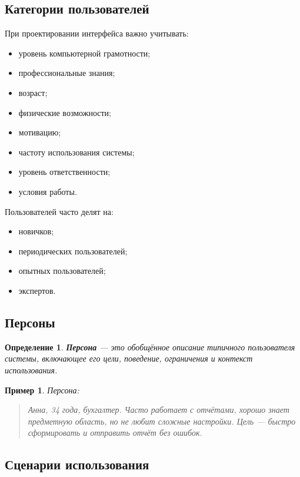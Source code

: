 \documentclass[12pt,a4paper]{article}
\newtheorem{definition}{Определение}
\newtheorem{example}{Пример}
\begin{document}
\subsection{Категории пользователей}

При проектировании интерфейса важно учитывать:
\begin{itemize}
    \item уровень компьютерной грамотности;
    \item профессиональные знания;
    \item возраст;
    \item физические возможности;
    \item мотивацию;
    \item частоту использования системы;
    \item уровень ответственности;
    \item условия работы.
\end{itemize}

Пользователей часто делят на:
\begin{itemize}
    \item новичков;
    \item периодических пользователей;
    \item опытных пользователей;
    \item экспертов.
\end{itemize}

\subsection{Персоны}

\begin{definition}
\textbf{Персона} --- это обобщённое описание типичного пользователя системы, включающее его цели, поведение, ограничения и контекст использования.
\end{definition}

\begin{example}
Персона:
\begin{quote}
Анна, 34 года, бухгалтер. Часто работает с отчётами, хорошо знает предметную область, но не любит сложные настройки. Цель --- быстро сформировать и отправить отчёт без ошибок.
\end{quote}
\end{example}

\subsection{Сценарии использования}
\end{document}
